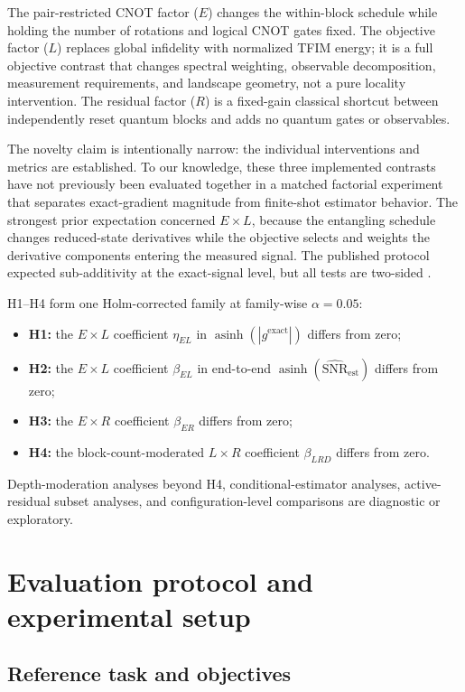 \documentclass[pdflatex,sn-mathphys-num,Numbered]{sn-jnl}
\newcommand{\snrest}{\widehat{\mathrm{SNR}}_{\mathrm{est}}}
\begin{document}
The pair-restricted CNOT factor ($E$) changes the within-block schedule while holding the number of rotations and logical CNOT gates fixed. The objective factor ($L$) replaces global infidelity with normalized TFIM energy; it is a full objective contrast that changes spectral weighting, observable decomposition, measurement requirements, and landscape geometry, not a pure locality intervention. The residual factor ($R$) is a fixed-gain classical shortcut between independently reset quantum blocks and adds no quantum gates or observables.

The novelty claim is intentionally narrow: the individual interventions and metrics are established. To our knowledge, these three implemented contrasts have not previously been evaluated together in a matched factorial experiment that separates exact-gradient magnitude from finite-shot estimator behavior. The strongest prior expectation concerned $E\times L$, because the entangling schedule changes reduced-state derivatives while the objective selects and weights the derivative components entering the measured signal. The published protocol expected sub-additivity at the exact-signal level, but all tests are two-sided \cite{shen2026gradient}.

H1--H4 form one Holm-corrected family at family-wise $\alpha=0.05$:
\begin{itemize}
\item \textbf{H1:} the $E\times L$ coefficient $\eta_{EL}$ in $\operatorname{asinh}(|g^{\mathrm{exact}}|)$ differs from zero;
\item \textbf{H2:} the $E\times L$ coefficient $\beta_{EL}$ in end-to-end $\operatorname{asinh}(\snrest)$ differs from zero;
\item \textbf{H3:} the $E\times R$ coefficient $\beta_{ER}$ differs from zero;
\item \textbf{H4:} the block-count-moderated $L\times R$ coefficient $\beta_{LRD}$ differs from zero.
\end{itemize}
Depth-moderation analyses beyond H4, conditional-estimator analyses, active-residual subset analyses, and configuration-level comparisons are diagnostic or exploratory.

\section{Evaluation protocol and experimental setup}\label{sec:methods}
\subsection{Reference task and objectives}
\end{document}
